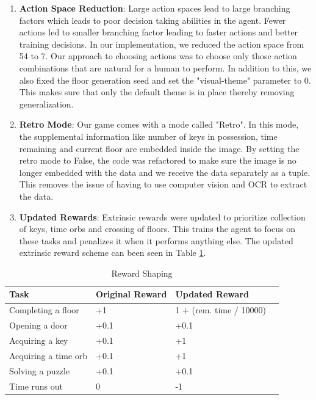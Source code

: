 \documentclass[conference]{IEEEtran}
\begin{document}
\begin{enumerate}
    \item \textbf{Action Space Reduction}: Large action spaces lead to large branching factors which leads to poor decision taking abilities in the agent. Fewer actions led to smaller branching factor leading to faster actions and better training decisions. In our implementation, we reduced the action space from 54 to 7. Our approach to choosing actions was to choose only those action combinations that are natural for a human to perform. In addition to this, we also fixed the floor generation seed and set the "visual-theme" parameter to 0. This makes sure that only the default theme is in place thereby removing generalization. 
    \item \textbf{Retro Mode}: Our game comes with a mode called "Retro". In this mode, the supplemental information like number of keys in possession, time remaining and current floor are embedded inside the image. By setting the retro mode to False, the code was refactored to make sure the image is no longer embedded with the data and we receive the data separately as a tuple. This removes the issue of having to use computer vision and OCR to extract the data.
    \item \textbf{Updated Rewards}: Extrinsic rewards were updated to prioritize collection of keys, time orbs and crossing of floors. This trains the agent to focus on these tasks and penalizes it when it performs anything else. The updated extrinsic reward scheme can been seen in Table \ref{reward_table}.
\end{enumerate}

\begin{table}[h!]
    \centering
    \begin{tabular}{ |l|l|l|l| } 
        \hline
        Task & Original Reward & Updated Reward \\
        \hline
        Completing a floor   & +1   & 1 + (rem. time / 10000) \\ 
        Opening a door       & +0.1 & +0.1 \\ 
        Acquiring a key      & +0.1 & +1 \\ 
        Acquiring a time orb & +0.1 & +1 \\ 
        Solving a puzzle     & +0.1 & +0.1 \\ 
        Time runs out        & 0    & -1 \\ 
    \hline
    \end{tabular}
    \vspace{1ex}
    \caption{Reward Shaping}
    \label{reward_table}
\end{table}
\end{document}
